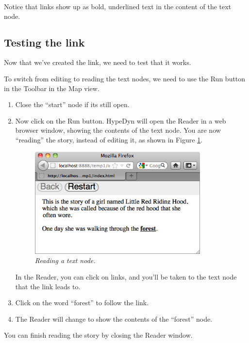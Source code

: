 \documentclass{article}
\begin{document}
Notice that links show up as bold, underlined text in the content of the text node.

\subsection{Testing the link}

Now that we've created the link, we need to test that it works.

To switch from editing to reading the text nodes, we need to use the Run button
in the Toolbar in the Map view.

\begin{enumerate}
  \item Close the ``start'' node if its still open.
  \item Now click on the Run button. HypeDyn will open the Reader in a web
  browser window, showing the contents of the text node. You are now
  ``reading'' the story, instead of editing it, as shown in Figure
  \ref{fig:reading}.

\begin{figure}[ht]
  \centering
  \includegraphics[width=9cm]{images/hypedyn-tutorial-1-figure-10}
  \caption{\textit{Reading a text node.}}
  \label{fig:reading}
\end{figure} 

In the Reader, you can click on links, and you'll be taken to the text node
that the link leads to.

\item Click on the word ``forest'' to follow the link.
\item The Reader will change to show the contents of the ``forest'' node.
\end{enumerate}

You can finish reading the story by closing the Reader window.

\end{document}

